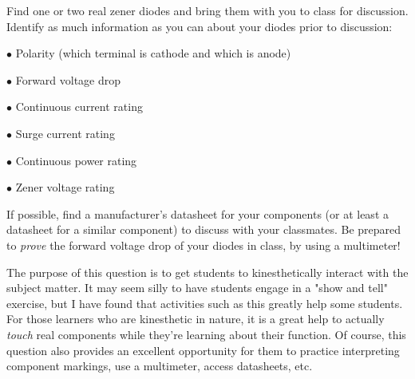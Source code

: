 

Find one or two real zener diodes and bring them with you to class for discussion.  Identify as much information as you can about your diodes prior to discussion:

\medskip
\item{$\bullet$} Polarity (which terminal is cathode and which is anode)
\item{$\bullet$} Forward voltage drop
\item{$\bullet$} Continuous current rating
\item{$\bullet$} Surge current rating
\item{$\bullet$} Continuous power rating
\item{$\bullet$} Zener voltage rating
\medskip







If possible, find a manufacturer's datasheet for your components (or at least a datasheet for a similar component) to discuss with your classmates.  Be prepared to {\it prove} the forward voltage drop of your diodes in class, by using a multimeter!







The purpose of this question is to get students to kinesthetically interact with the subject matter.  It may seem silly to have students engage in a "show and tell" exercise, but I have found that activities such as this greatly help some students.  For those learners who are kinesthetic in nature, it is a great help to actually {\it touch} real components while they're learning about their function.  Of course, this question also provides an excellent opportunity for them to practice interpreting component markings, use a multimeter, access datasheets, etc.




